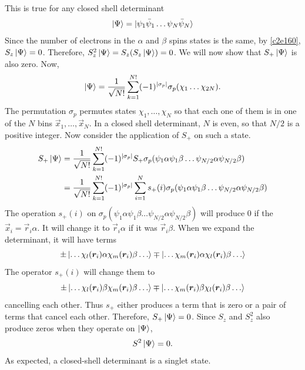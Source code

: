 This is true for any closed shell determinant
\[
\ket{\Psi} = \ket{\psi_1\bar{\psi}_1\ldots\psi_N\bar{\psi}_N}
\]
Since the number of electrons in the $\alpha$ and $\beta$ spins states is the 
same, by \eqref{c2e160}, $S_z\ket{\Psi} = 0$. Therefore, $S_z^2\ket{\Psi} = 
S_z(S_z\ket{\Psi}) = 0$. We will now show that $S_+\ket{\Psi}$ is also zero. Now,
\[
\ket{\Psi} = \frac{1}{\sqrt{N!}}\sum_{k=1}^{N!}(-1)^{|\sigma_p|}\sigma_p(\chi_1
\ldots\chi_{2N}).
\]
The permutation $\sigma_p$ permutes states $\chi_1, \ldots, \chi_N$ so that 
each one of them is in one of the $N$ bins $\vec{x}_1, \ldots, \vec{x}_N$. In
a closed shell determinant, $N$ is even, so that $N/2$ is a positive integer.
Now consider the application of $S_+$ on such a state.
\[
\begin{aligned}
S_+\ket{\Psi} &= \frac{1}{\sqrt{N!}}\sum_{k=1}^{N!}(-1)^{|\sigma_p|}S_+
     \sigma_p(\psi_1\alpha\psi_1\beta\ldots\psi_{N/2}\alpha\psi_{N/2}\beta) \\
 &= \frac{1}{\sqrt{N!}}\sum_{k=1}^{N!}(-1)^{|\sigma_p|}\sum_{i=1}^N s_+(i)
     \sigma_p(\psi_1\alpha\psi_1\beta\ldots\psi_{N/2}\alpha\psi_{N/2}\beta)
\end{aligned}
\]
The operation $s_+(i)$ on $\sigma_p(\psi_1\alpha\psi_1\beta\ldots\psi_{N/2}
\alpha\psi_{N/2}\beta)$ will produce $0$ if the $\vec{x}_i = \vec{r}_i\alpha$.
It will change it to $\vec{r}_i\alpha$ if it was $\vec{r}_i\beta$. When we
expand the determinant, it will have terms
\[
\pm\ket{\ldots\chi_l(\bm{r}_i)\alpha\chi_m(\bm{r}_i)\beta\ldots}
\mp\ket{\ldots\chi_m(\bm{r}_i)\alpha\chi_l(\bm{r}_i)\beta\ldots}
\]
The operator $s_+(i)$ will change them to
\[
\pm\ket{\ldots\chi_l(\bm{r}_i)\beta\chi_m(\bm{r}_i)\beta\ldots}
\mp\ket{\ldots\chi_m(\bm{r}_i)\beta\chi_l(\bm{r}_i)\beta\ldots}
\]
cancelling each other. Thus $s_+$ either produces a term that is zero or a pair
of terms that cancel each other. Therefore, $S_+\ket{\Psi} = 0$. Since $S_z$ and
$S_z^2$ also produce zeros when they operate on $\ket{\Psi}$, 
\begin{equation}\label{c2e163}
S^2\ket{\Psi} = 0.
\end{equation}
As expected, a closed-shell determinant is a singlet state.

